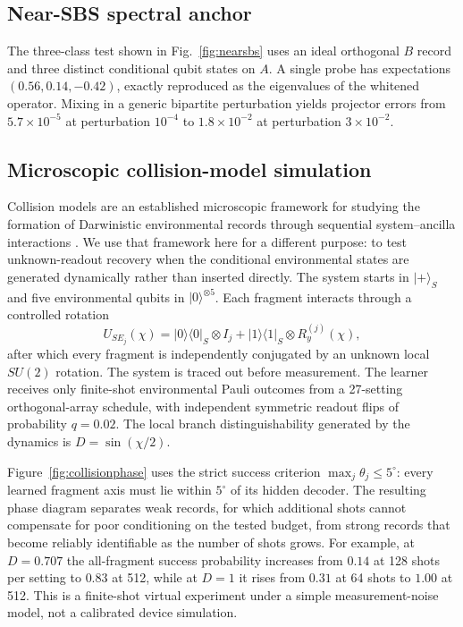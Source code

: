 \subsection{Near-SBS spectral anchor}

The three-class test shown in Fig.~\ref{fig:nearsbs} uses an ideal orthogonal $B$ record and three distinct conditional qubit states on $A$.  A single probe has expectations $(0.56,0.14,-0.42)$, exactly reproduced as the eigenvalues of the whitened operator.  Mixing in a generic bipartite perturbation yields projector errors from $5.7\times10^{-5}$ at perturbation $10^{-4}$ to $1.8\times10^{-2}$ at perturbation $3\times10^{-2}$.

\subsection{Microscopic collision-model simulation}

Collision models are an established microscopic framework for studying the formation of Darwinistic environmental records through sequential system--ancilla interactions \cite{campbell2019}.  We use that framework here for a different purpose: to test unknown-readout recovery when the conditional environmental states are generated dynamically rather than inserted directly.  The system starts in $|+\rangle_S$ and five environmental qubits in $|0\rangle^{\otimes5}$.  Each fragment interacts through a controlled rotation
\[
U_{SE_j}(\chi)=|0\rangle\!\langle0|_S\otimes I_j
+|1\rangle\!\langle1|_S\otimes R_y^{(j)}(\chi),
\]
after which every fragment is independently conjugated by an unknown local $SU(2)$ rotation.  The system is traced out before measurement.  The learner receives only finite-shot environmental Pauli outcomes from a 27-setting orthogonal-array schedule, with independent symmetric readout flips of probability $q=0.02$.  The local branch distinguishability generated by the dynamics is $D=\sin(\chi/2)$.

Figure~\ref{fig:collisionphase} uses the strict success criterion $\max_j\theta_j\le5^\circ$: every learned fragment axis must lie within $5^\circ$ of its hidden decoder.  The resulting phase diagram separates weak records, for which additional shots cannot compensate for poor conditioning on the tested budget, from strong records that become reliably identifiable as the number of shots grows.  For example, at $D=0.707$ the all-fragment success probability increases from $0.14$ at 128 shots per setting to $0.83$ at 512, while at $D=1$ it rises from $0.31$ at 64 shots to $1.00$ at 512.  This is a finite-shot virtual experiment under a simple measurement-noise model, not a calibrated device simulation.

